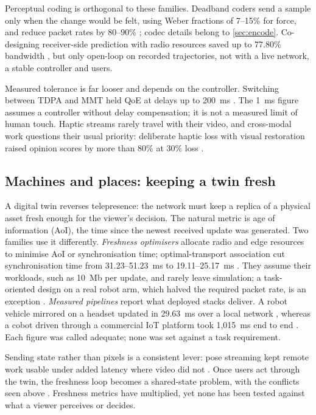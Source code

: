 Perceptual coding is orthogonal to these families. Deadband coders send a sample only when the change would be felt, using Weber fractions of 7--15\% for force, and reduce packet rates by 80--90\% \cite{W2912555763}; codec details belong to \cref{sec:encode}. Co-designing receiver-side prediction with radio resources saved up to 77.80\% bandwidth \cite{W4321488300}, but only open-loop on recorded trajectories, not with a live network, a stable controller and users.

Measured tolerance is far looser and depends on the controller. Switching between TDPA and MMT held QoE at delays up to 200~ms \cite{W4200154132}. The 1~ms figure assumes a controller without delay compensation; it is not a measured limit of human touch. Haptic streams rarely travel with their video, and cross-modal work questions their usual priority: deliberate haptic loss with visual restoration raised opinion scores by more than 80\% at 30\% loss \cite{W4401507901}.

\subsection{Machines and places: keeping a twin fresh}

A digital twin reverses telepresence: the network must keep a replica of a physical asset fresh enough for the viewer's decision. The natural metric is age of information (AoI), the time since the newest received update was generated. Two families use it differently. \emph{Freshness optimisers} allocate radio and edge resources to minimise AoI or synchronisation time; optimal-transport association cut synchronisation time from 31.23--51.23~ms to 19.11--25.17~ms \cite{W4387870504}. They assume their workloads, such as 10~Mb per update, and rarely leave simulation; a task-oriented design on a real robot arm, which halved the required packet rate, is an exception \cite{W4390044355}. \emph{Measured pipelines} report what deployed stacks deliver. A robot vehicle mirrored on a headset updated in 29.63~ms over a local network \cite{W7213228059}, whereas a cobot driven through a commercial IoT platform took 1,015~ms end to end \cite{W7168263637}. Each figure was called adequate; none was set against a task requirement.

Sending state rather than pixels is a consistent lever: pose streaming kept remote work usable under added latency where video did not \cite{W4312316324}. Once users act through the twin, the freshness loop becomes a shared-state problem, with the conflicts seen above \cite{W7168268649}. Freshness metrics have multiplied, yet none has been tested against what a viewer perceives or decides.

